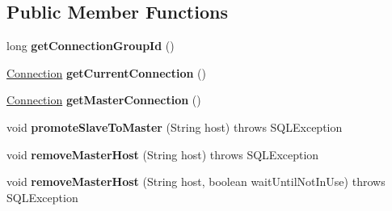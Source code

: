 \subsection*{Public Member Functions}
\begin{DoxyCompactItemize}
\item 
\mbox{\label{interfacecom_1_1mysql_1_1jdbc_1_1_replication_connection_a508f5d609758a0a94aa4e10271895e68}} 
long {\bfseries get\+Connection\+Group\+Id} ()
\item 
\mbox{\label{interfacecom_1_1mysql_1_1jdbc_1_1_replication_connection_adc6406809efc56bf9eca1ebf1958421f}} 
\mbox{\hyperlink{interfacecom_1_1mysql_1_1jdbc_1_1_connection}{Connection}} {\bfseries get\+Current\+Connection} ()
\item 
\mbox{\label{interfacecom_1_1mysql_1_1jdbc_1_1_replication_connection_a4a5d6e9a33cf0919a8b281b7868759a2}} 
\mbox{\hyperlink{interfacecom_1_1mysql_1_1jdbc_1_1_connection}{Connection}} {\bfseries get\+Master\+Connection} ()
\item 
\mbox{\label{interfacecom_1_1mysql_1_1jdbc_1_1_replication_connection_a3dfae156c3661a0a824056d487c6cf7a}} 
void {\bfseries promote\+Slave\+To\+Master} (String host)  throws S\+Q\+L\+Exception
\item 
\mbox{\label{interfacecom_1_1mysql_1_1jdbc_1_1_replication_connection_a3d0027a688075baccf72200f76009b57}} 
void {\bfseries remove\+Master\+Host} (String host)  throws S\+Q\+L\+Exception
\item 
\mbox{\label{interfacecom_1_1mysql_1_1jdbc_1_1_replication_connection_ad4a423b3e22aa727bc6c9dd31e8a1b9f}} 
void {\bfseries remove\+Master\+Host} (String host, boolean wait\+Until\+Not\+In\+Use)  throws S\+Q\+L\+Exception
\item 
\mbox{\label{interfacecom_1_1mysql_1_1jdbc_1_1_replication_connection_a326268fa603d70ac20b3c3095962ff01}} 

\end{DoxyCompactItemize}
